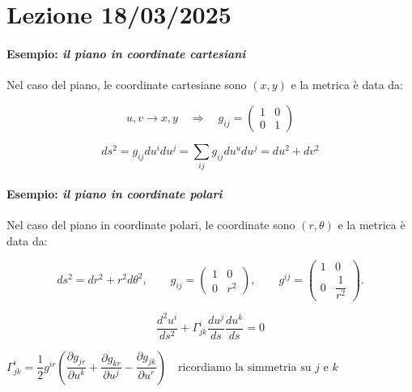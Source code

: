 \chapter{Lezione 18/03/2025}

\subsubsection{Esempio: \textit{il piano in coordinate cartesiani}}

Nel caso del piano, le coordinate cartesiane sono $(x, y)$ e la metrica è data da:

$$
u, v \rightarrow x, y
\quad \Rightarrow \quad
g_{ij} = 
\begin{pmatrix}
    1 & 0 \\
    0 & 1
\end{pmatrix}
$$

$$
ds^2 = g_{ij} du^i du^j = \sum_{ij} g_{ij}du^udu^j = du^2 + dv^2
$$


\subsubsection{Esempio: \textit{il piano in coordinate polari}}

Nel caso del piano in coordinate polari, le coordinate sono $(r, \theta)$ e la metrica è data da:

$$
ds^2 = dr^2 + r^2 d\theta^2,
\quad 
\quad 
g_{ij} = \begin{pmatrix}
    1 & 0 \\
    0 & r^2
\end{pmatrix},
\quad
\quad
g^{ij} = \begin{pmatrix}
    1 & 0 \\
    0 & \dfrac{1}{r^2}
\end{pmatrix}.
$$

$$
\dfrac{d^2u^i}{ds^2} + \Gamma_{jk}^i \dfrac{du^j}{ds} \dfrac{du^k}{ds} = 0
$$

$
\Gamma_{jk}^i = \dfrac{1}{2} g^{ir} \left( \dfrac{\partial g_{jr}}{\partial u^k} + \dfrac{\partial g_{kr}}{\partial u^j} - \dfrac{\partial g_{jk}}{\partial u^r} \right) \quad \text{ricordiamo la simmetria su $j$ e $k$}
$

